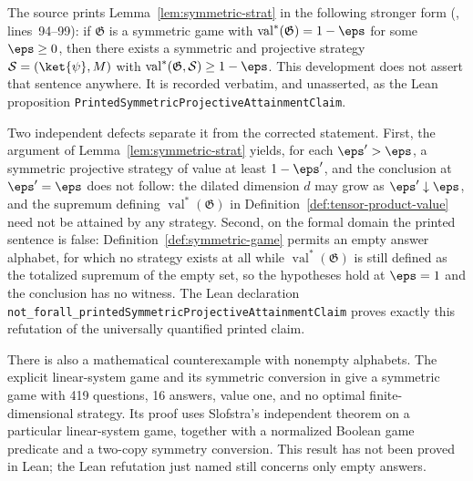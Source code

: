 \begin{remark}\label{rem:symmetric-strat-limit}
	The source prints Lemma~\ref{lem:symmetric-strat} in the following stronger form (, lines~94--99): if $\mathfrak G$ is a symmetric game with $\operatorname{val}^*(\mathfrak G) = 1-\eps$ for some $\eps \ge 0$, then there exists a symmetric and projective strategy $\mathcal S = (\ket{\psi}, M)$ with $\operatorname{val}^*(\mathfrak G, \mathcal S) \ge 1-\eps$. This development does not assert that sentence anywhere. It is recorded verbatim, and unasserted, as the Lean proposition \texttt{PrintedSymmetricProjectiveAttainmentClaim}.

	Two independent defects separate it from the corrected statement. First, the argument of Lemma~\ref{lem:symmetric-strat} yields, for each $\eps' > \eps$, a symmetric projective strategy of value at least $1-\eps'$, and the conclusion at $\eps' = \eps$ does not follow: the dilated dimension $d$ may grow as $\eps' \downarrow \eps$, and the supremum defining $\operatorname{val}^*(\mathfrak G)$ in Definition~\ref{def:tensor-product-value} need not be attained by any strategy. Second, on the formal domain the printed sentence is false: Definition~\ref{def:symmetric-game} permits an empty answer alphabet, for which no strategy exists at all while $\operatorname{val}^*(\mathfrak G)$ is still defined as the totalized supremum of the empty set, so the hypotheses hold at $\eps = 1$ and the conclusion has no witness. The Lean declaration \texttt{not\_forall\_printed\-Symmetric\-Projective\-Attainment\-Claim} proves exactly this refutation of the universally quantified printed claim.

	There is also a mathematical counterexample with nonempty alphabets. The explicit linear-system game and its symmetric conversion in \cite{gap:qpbt_symmetrization-attainment} give a symmetric game with 419 questions, 16 answers, value one, and no optimal finite-dimensional strategy. Its proof uses Slofstra's independent theorem on a particular linear-system game, together with a normalized Boolean game predicate and a two-copy symmetry conversion. This result has not been proved in Lean; the Lean refutation just named still concerns only empty answers.


\end{remark}
